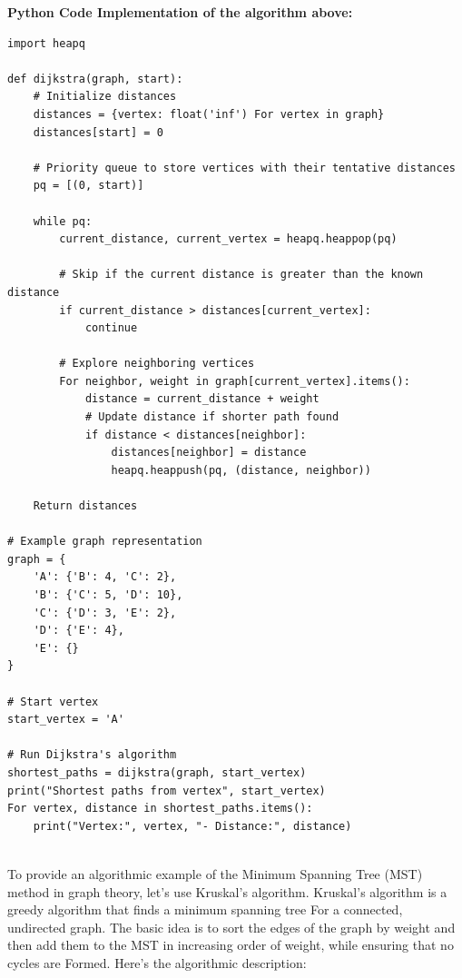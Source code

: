 \documentclass[12pt]{book} %
\begin{document}
\FloatBarrier
\textbf{Python Code Implementation of the algorithm above:}
\FloatBarrier
\begin{lstlisting}
import heapq

def dijkstra(graph, start):
    # Initialize distances
    distances = {vertex: float('inf') For vertex in graph}
    distances[start] = 0
    
    # Priority queue to store vertices with their tentative distances
    pq = [(0, start)]
    
    while pq:
        current_distance, current_vertex = heapq.heappop(pq)
        
        # Skip if the current distance is greater than the known distance
        if current_distance > distances[current_vertex]:
            continue
        
        # Explore neighboring vertices
        For neighbor, weight in graph[current_vertex].items():
            distance = current_distance + weight
            # Update distance if shorter path found
            if distance < distances[neighbor]:
                distances[neighbor] = distance
                heapq.heappush(pq, (distance, neighbor))
    
    Return distances

# Example graph representation
graph = {
    'A': {'B': 4, 'C': 2},
    'B': {'C': 5, 'D': 10},
    'C': {'D': 3, 'E': 2},
    'D': {'E': 4},
    'E': {}
}

# Start vertex
start_vertex = 'A'

# Run Dijkstra's algorithm
shortest_paths = dijkstra(graph, start_vertex)
print("Shortest paths from vertex", start_vertex)
For vertex, distance in shortest_paths.items():
    print("Vertex:", vertex, "- Distance:", distance)
    
\end{lstlisting}
\FloatBarrier

To provide an algorithmic example of the Minimum Spanning Tree (MST) method in graph theory, let's use Kruskal's algorithm. Kruskal's algorithm is a greedy algorithm that finds a minimum spanning tree For a connected, undirected graph. The basic idea is to sort the edges of the graph by weight and then add them to the MST in increasing order of weight, while ensuring that no cycles are Formed. Here's the algorithmic description:
\end{document}
